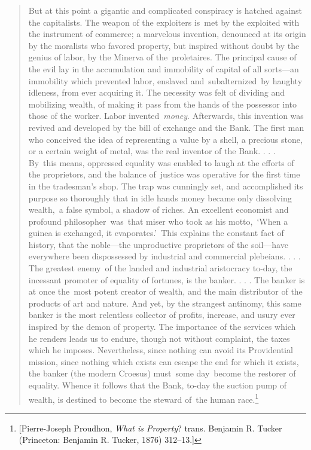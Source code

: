 \documentclass[twoside,symmetric,nobib,justified]{tufte-book}
\begin{document}
\begin{quote}
But at this point a gigantic and complicated conspiracy is hatched
against the capitalists. The weapon of the exploiters is~met by the
exploited with the instrument of commerce; a marvelous invention,
denounced at its origin by the moralists who favored property, but
inspired without doubt by the genius of labor, by the Minerva of
the~proletaires. The principal cause of the evil lay in the accumulation
and immobility of capital of all sorts---an immobility which prevented
labor, enslaved and~subalternized~by haughty idleness, from ever
acquiring it. The necessity was felt of dividing and mobilizing wealth,
of making it pass from the hands of the possessor into those of the
worker. Labor invented~\emph{money}. Afterwards, this invention was
revived and developed by the bill of exchange and the Bank. The first
man who conceived the idea of representing a value by a shell, a
precious stone, or a certain weight of metal, was the real inventor of
the Bank. . . . By~this means, oppressed equality was enabled to laugh
at the efforts of the proprietors, and the balance of~justice was
operative for the first time in the tradesman's shop. The trap was
cunningly set, and accomplished its purpose so thoroughly that in idle
hands money became only dissolving wealth,~a false symbol, a shadow of
riches. An excellent economist and profound philosopher~was~that miser
who took as his motto,~`When a guinea is exchanged, it evaporates.'~This
explains the constant fact of history, that the noble---the unproductive
proprietors of the soil---have everywhere been dispossessed by
industrial and commercial plebeians. . . . The greatest enemy~of the
landed and industrial aristocracy to-day, the incessant promoter of
equality of fortunes, is the banker. . . . The banker is at once
the~most potent creator of wealth, and the main distributor of the
products of art and nature. And yet, by the strangest antinomy, this
same banker is the most relentless collector of profits, increase, and
usury ever inspired by the demon of property. The importance of the
services which he renders leads us to endure, though not without
complaint, the taxes which he imposes. Nevertheless, since nothing can
avoid its Providential mission, since nothing which exists can escape
the end for which it exists, the banker (the modern Croesus) must~some
day~become the restorer of equality. Whence it follows that the Bank,
to-day the suction pump of wealth, is destined to become the steward
of~the human race.\footnote{{[}Pierre-Joseph Proudhon, \emph{What is
  Property}? trans. Benjamin R. Tucker (Princeton: Benjamin R. Tucker,
  1876) 312--13.{]}}
\end{quote}
\end{document}
